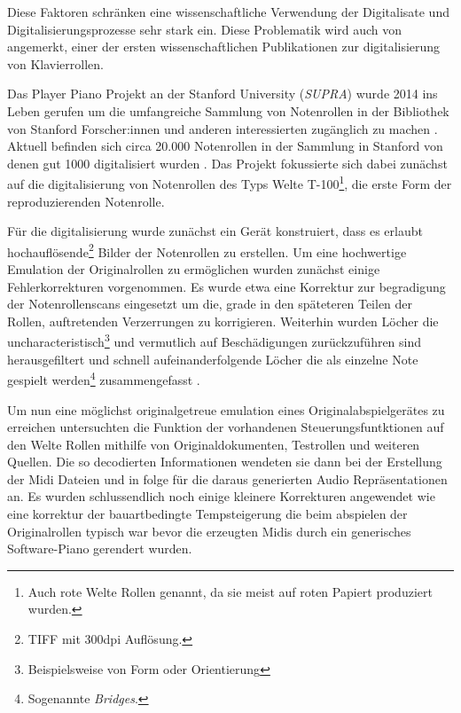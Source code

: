 Diese Faktoren schränken eine wissenschaftliche Verwendung der Digitalisate und Digitalisierungsprozesse sehr stark ein.
Diese Problematik wird auch von \textcite[]{zoltan_1994} angemerkt, einer der ersten wissenschaftlichen Publikationen zur digitalisierung von Klavierrollen.





Das Player Piano Projekt an der Stanford University (\textit{SUPRA}) wurde 2014 ins Leben gerufen um die umfangreiche Sammlung von Notenrollen in der Bibliothek von Stanford Forscher:innen und anderen interessierten zugänglich zu machen \autocite*[]{shi_2019}.
Aktuell befinden sich circa 20.000 Notenrollen in der Sammlung in Stanford von denen gut 1000 digitalisiert wurden \autocite*[]{broadwell_2022}.
Das Projekt fokussierte sich dabei zunächst auf die digitalisierung von Notenrollen des Typs Welte T-100\footnote{Auch rote Welte Rollen genannt, da sie meist auf roten Papiert produziert wurden.}, die erste Form der reproduzierenden Notenrolle.

Für die digitalisierung wurde zunächst ein Gerät konstruiert, dass es erlaubt hochauflösende\footnote{TIFF mit 300dpi Auflösung.} Bilder der Notenrollen zu erstellen.
Um eine hochwertige Emulation der Originalrollen zu ermöglichen wurden zunächst einige Fehlerkorrekturen vorgenommen.
Es wurde etwa eine Korrektur zur begradigung der Notenrollenscans eingesetzt um die, grade in den späteteren Teilen der Rollen, auftretenden Verzerrungen zu korrigieren.
Weiterhin wurden Löcher die uncharacteristisch\footnote{Beispielsweise von Form oder Orientierung} und vermutlich auf Beschädigungen zurückzuführen sind herausgefiltert und schnell aufeinanderfolgende Löcher die als einzelne Note gespielt werden\footnote{Sogenannte \textit{Bridges}.} zusammengefasst \autocite*[519f]{shi_2019}.

Um nun eine möglichst originalgetreue emulation eines Originalabspielgerätes zu erreichen untersuchten \autocite[521f]{shi_2019} die Funktion der vorhandenen Steuerungsfuntktionen auf den Welte Rollen mithilfe von Originaldokumenten, Testrollen und weiteren Quellen.
Die so decodierten Informationen wendeten sie dann bei der Erstellung der Midi Dateien und in folge für die daraus generierten Audio Repräsentationen an.
Es wurden schlussendlich noch einige kleinere Korrekturen angewendet wie eine korrektur der bauartbedingte Tempsteigerung die beim abspielen der Originalrollen typisch war bevor die erzeugten Midis durch ein generisches Software-Piano gerendert wurden.

